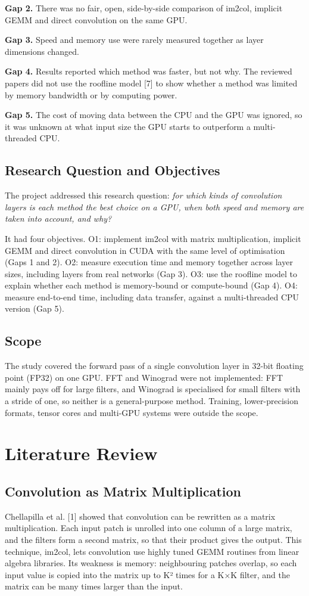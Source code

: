 \documentclass[12pt,a4paper]{article}
\begin{document}
\textbf{Gap 2.} There was no fair, open, side-by-side comparison of im2col, implicit GEMM and direct convolution on the same GPU.

\textbf{Gap 3.} Speed and memory use were rarely measured together as layer dimensions changed.

\textbf{Gap 4.} Results reported which method was faster, but not why. The reviewed papers did not use the roofline model [7] to show whether a method was limited by memory bandwidth or by computing power.

\textbf{Gap 5.} The cost of moving data between the CPU and the GPU was ignored, so it was unknown at what input size the GPU starts to outperform a multi-threaded CPU.

\subsection{Research Question and Objectives}
The project addressed this research question: \textit{for which kinds of convolution layers is each method the best choice on a GPU, when both speed and memory are taken into account, and why?}

It had four objectives. O1: implement im2col with matrix multiplication, implicit GEMM and direct convolution in CUDA with the same level of optimisation (Gaps 1 and 2). O2: measure execution time and memory together across layer sizes, including layers from real networks (Gap 3). O3: use the roofline model to explain whether each method is memory-bound or compute-bound (Gap 4). O4: measure end-to-end time, including data transfer, against a multi-threaded CPU version (Gap 5).

\subsection{Scope}
The study covered the forward pass of a single convolution layer in 32-bit floating point (FP32) on one GPU. FFT and Winograd were not implemented: FFT mainly pays off for large filters, and Winograd is specialised for small filters with a stride of one, so neither is a general-purpose method. Training, lower-precision formats, tensor cores and multi-GPU systems were outside the scope.

\section{Literature Review}
\subsection{Convolution as Matrix Multiplication}
Chellapilla et al. [1] showed that convolution can be rewritten as a matrix multiplication. Each input patch is unrolled into one column of a large matrix, and the filters form a second matrix, so that their product gives the output. This technique, im2col, lets convolution use highly tuned GEMM routines from linear algebra libraries. Its weakness is memory: neighbouring patches overlap, so each input value is copied into the matrix up to K² times for a K×K filter, and the matrix can be many times larger than the input.
\end{document}
